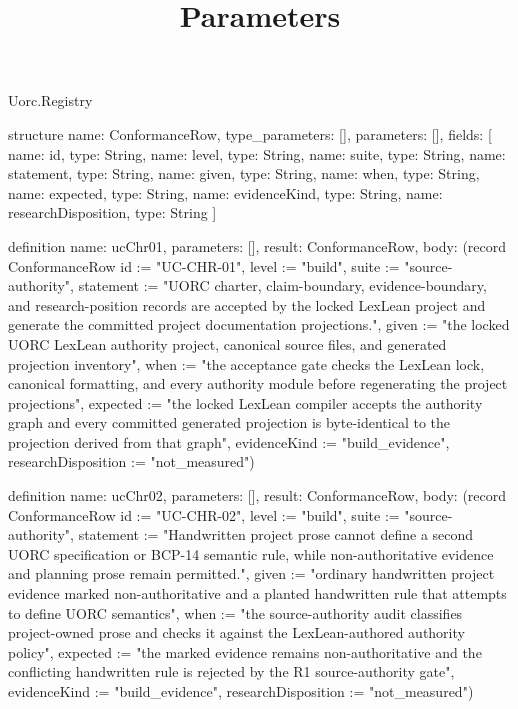 \begin{lexlean}{Uorc.Registry}
\title{Parameters}
\begin{semanticmodule}
structure{
  name: ConformanceRow,
  type_parameters: [],
  parameters: [],
  fields: [
    {name: id, type: String},
    {name: level, type: String},
    {name: suite, type: String},
    {name: statement, type: String},
    {name: given, type: String},
    {name: when, type: String},
    {name: expected, type: String},
    {name: evidenceKind, type: String},
    {name: researchDisposition, type: String}
  ]
}

definition{
  name: ucChr01,
  parameters: [],
  result: ConformanceRow,
  body: (record ConformanceRow {id := "UC-CHR-01", level := "build", suite := "source-authority", statement := "UORC charter, claim-boundary, evidence-boundary, and research-position records are accepted by the locked LexLean project and generate the committed project documentation projections.", given := "the locked UORC LexLean authority project, canonical source files, and generated projection inventory", when := "the acceptance gate checks the LexLean lock, canonical formatting, and every authority module before regenerating the project projections", expected := "the locked LexLean compiler accepts the authority graph and every committed generated projection is byte-identical to the projection derived from that graph", evidenceKind := "build_evidence", researchDisposition := "not_measured"})
}

definition{
  name: ucChr02,
  parameters: [],
  result: ConformanceRow,
  body: (record ConformanceRow {id := "UC-CHR-02", level := "build", suite := "source-authority", statement := "Handwritten project prose cannot define a second UORC specification or BCP-14 semantic rule, while non-authoritative evidence and planning prose remain permitted.", given := "ordinary handwritten project evidence marked non-authoritative and a planted handwritten rule that attempts to define UORC semantics", when := "the source-authority audit classifies project-owned prose and checks it against the LexLean-authored authority policy", expected := "the marked evidence remains non-authoritative and the conflicting handwritten rule is rejected by the R1 source-authority gate", evidenceKind := "build_evidence", researchDisposition := "not_measured"})
}


\end{semanticmodule}
\end{lexlean}
